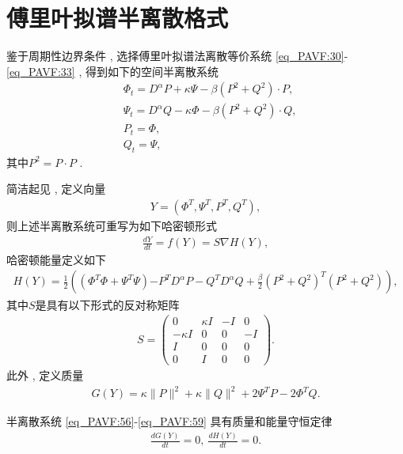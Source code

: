 \section{傅里叶拟谱半离散格式}\label{Section_PAVF: 2_2}

鉴于周期性边界条件 , 选择傅里叶拟谱法离散等价系统 \eqref{eq_PAVF:30}-\eqref{eq_PAVF:33} , 
得到如下的空间半离散系统
\begin{align}
&\varPhi_{t}=D^{\alpha}P+\kappa \Psi-\beta \left( P^{2}+Q^{2}\right)\cdot P , \label{eq_PAVF:56}\\
&\Psi_{t}=D^{\alpha}Q-\kappa \varPhi-\beta \left( P^{2}+Q^{2}\right)\cdot Q , \label{eq_PAVF:57}\\
&P_t=\varPhi , \label{eq_PAVF:58}\\
&Q_t=\Psi , \label{eq_PAVF:59}
\end{align}
其中$P^{2}=P \cdot P$ . 

简洁起见 , 定义向量
\begin{align}\label{eq_PAVF:60a}
Y=\left(\varPhi^{T} , \Psi^{T} , P^{T} , Q^{T}\right) , 
\end{align}
则上述半离散系统可重写为如下哈密顿形式
\begin{align}\label{eq_PAVF:60}
\frac{d Y}{d t}=f(Y)=S \nabla H(Y) , 
\end{align}
哈密顿能量定义如下
\begin{align}\label{eq_PAVF:61}
	H(Y)=\frac{1}{2}\left((\varPhi^{T}\varPhi+\Psi^{T}\Psi){-P^{T} D^{\alpha} P-Q^{T} D^{\alpha} Q}+\frac{\beta}{2}(P^2+Q^2)^{T}(P^2+Q^2)\right) , 
\end{align}
其中$S$是具有以下形式的反对称矩阵
\begin{align}\label{eq_PAVF:62}
S=\left(\begin{array}{cccc}
0 & \kappa I & -I & 0 \\
-\kappa I & 0 & 0 & -I \\
I & 0 & 0 & 0 \\
0 & I & 0 & 0
\end{array}\right) . 
\end{align}
此外 , 定义质量
\begin{align}\label{eq_PAVF:63}
G(Y)=\kappa\|P\|^{2}+\kappa\|Q\|^{2} +2\Psi^{T}P-2\varPhi^{T}Q . 
\end{align}

\begin{theorem}	\label{thm_PAVF:3}
	半离散系统 \eqref{eq_PAVF:56}-\eqref{eq_PAVF:59} 具有质量和能量守恒定律
\begin{align}
\frac{d G(Y)}{d t}=0 , ~\frac{d H(Y)}{d t}=0 . 
\end{align}
\end{theorem}

